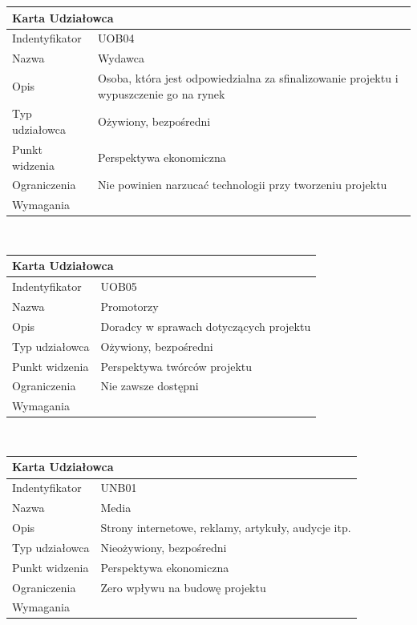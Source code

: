 \documentclass[a4paper,11pt]{report}
\begin{document}
	\begin{tabular}{|p{3cm}|p{11cm}|}
	\hline
	\multicolumn{2}{|l|}{\textbf{Karta Udziałowca}}\\
	\hline
	Indentyfikator&UOB04\\
	\hline
	Nazwa&Wydawca\\
	\hline
	Opis&Osoba, która jest odpowiedzialna za sfinalizowanie projektu i wypuszczenie go na rynek\\
	\hline
	Typ udziałowca&Ożywiony, bezpośredni\\
	\hline
	Punkt widzenia&Perspektywa ekonomiczna\\
	\hline
	Ograniczenia&Nie powinien narzucać technologii przy tworzeniu projektu\\
	\hline
	Wymagania&\\
	\hline
	\end{tabular}\\
	\begin{tabular}{|p{3cm}|p{11cm}|}
	\hline
	\multicolumn{2}{|l|}{\textbf{Karta Udziałowca}}\\
	\hline
	Indentyfikator&UOB05\\
	\hline
	Nazwa&Promotorzy\\
	\hline
	Opis&Doradcy w sprawach dotyczących projektu\\
	\hline
	Typ udziałowca&Ożywiony, bezpośredni\\
	\hline
	Punkt widzenia&Perspektywa twórców projektu\\
	\hline
	Ograniczenia&Nie zawsze dostępni\\
	\hline
	Wymagania&\\
	\hline
	\end{tabular}\\
	\begin{tabular}{|p{3cm}|p{11cm}|}
	\hline
	\multicolumn{2}{|l|}{\textbf{Karta Udziałowca}}\\
	\hline
	Indentyfikator&UNB01\\
	\hline
	Nazwa&Media\\
	\hline
	Opis&Strony internetowe, reklamy, artykuły, audycje itp.\\
	\hline
	Typ udziałowca&Nieożywiony, bezpośredni\\
	\hline
	Punkt widzenia&Perspektywa ekonomiczna\\
	\hline
	Ograniczenia&Zero wpływu na budowę projektu\\
	\hline
	Wymagania&\\
	\hline
	\end{tabular}\\
\end{document}
